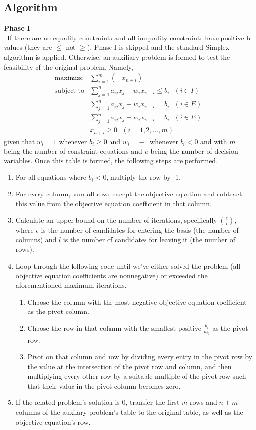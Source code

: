 \documentclass[11pt]{article}
\begin{document}
\subsection{Algorithm}
\textbf{Phase I}\\
~\indent If there are no equality constraints and all inequality constraints have positive b-values (they are $\leq$ not $\geq$), Phase I is skipped and the standard Simplex algorithm is applied. Otherwise, an auxiliary problem is formed to test the feasibility of the original problem. Namely,
\begin{eqnarray*}
\mbox{maximize}& \sum\limits_{i=1}^m (-x_{n+i})\\
\mbox{subject to}& \sum\limits_{j=1}^n a_{ij}x_j + w_ix_{n+i} \leq b_i\mbox{\ \ }(i \in I)\\
 & \sum\limits_{j=1}^n a_{ij}x_j + w_ix_{n+i} = b_i\mbox{\ \ }(i \in E)\\
 & \sum\limits_{j=1}^n a_{ij}x_j - w_ix_{n+i} = b_i\mbox{\ \ }(i \in E)\\
 & x_{n+i} \geq 0\mbox{\ \ }(i = 1, 2,...,m)
\end{eqnarray*}
given that $w_i = 1$ whenever $b_i \geq 0$ and $w_i = -1$ whenever $b_i < 0$ and with $m$ being the number of constraint equations and $n$ being the number of decision variables. Once this table is formed, the following steps are performed.
\begin{enumerate}
\item For all equations where $b_i < 0$, multiply the row by -1.
\item For every column, sum all rows except the objective equation and subtract this value from the objective equation coefficient in that column.
\item Calculate an upper bound on the number of iterations, specifically $e \choose l$, where $e$ is the number of candidates for entering the basis (the number of columns) and $l$ is the number of candidates for leaving it (the number of rows). 
\item Loop through the following code until we've either solved the problem (all objective equation coefficients are nonnegative) or exceeded the aforementioned maximum iterations.
  \begin{enumerate}
  \item Choose the column with the most negative objective equation coefficient as the pivot column.
  \item Choose the row in that column with the smallest positive $\frac{b_i}{a_{ij}}$ as the pivot row.
  \item Pivot on that column and row by dividing every entry in the pivot row by the value at the intersection of the pivot row and column, and then multiplying every other row by a suitable multiple of the pivot row such that their value in the pivot column becomes zero.
  \end{enumerate}
\item If the related problem's solution is 0, transfer the first $m$ rows and $n+m$ columns of the auxilary problem's table to the original table, as well as the objective equation's row.
\end{enumerate}
\end{document}
